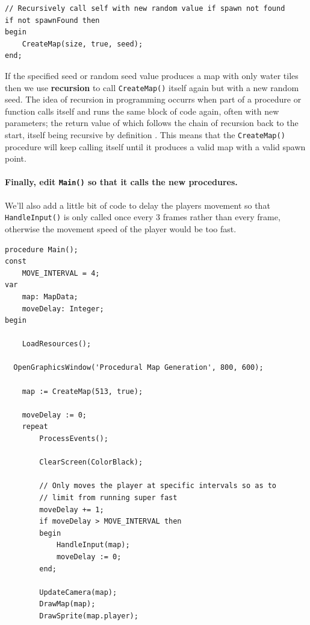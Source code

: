 \documentclass{article}
\begin{document}
\begin{verbatim}
// Recursively call self with new random value if spawn not found
if not spawnFound then
begin
	CreateMap(size, true, seed);
end;
\end{verbatim}

If the specified seed or random seed value produces a map with only water tiles then we use \textbf{recursion} to call \texttt{CreateMap()} itself again but with a new random seed. The idea of recursion in programming occurrs when part of a procedure or function calls itself and runs the same block of code again, often with new parameters; the return value of which follows the chain of recursion back to the start, itself being recursive by definition \parencite{recursion}. This means that the \texttt{CreateMap()} procedure will keep calling itself until it produces a valid map with a valid spawn point.

\paragraph{Finally, edit \texttt{Main()} so that it calls the new procedures.} We'll also add a little bit of code to delay the players movement so that \texttt{HandleInput()} is only called once every 3 frames rather than every frame, otherwise the movement speed of the player would be too fast.

\begin{verbatim}
procedure Main();
const
	MOVE_INTERVAL = 4;
var
	map: MapData;
	moveDelay: Integer;
begin

	LoadResources();
  
  OpenGraphicsWindow('Procedural Map Generation', 800, 600);
  
	map := CreateMap(513, true);

	moveDelay := 0;
	repeat
		ProcessEvents();

		ClearScreen(ColorBlack);
		
		// Only moves the player at specific intervals so as to
		// limit from running super fast
		moveDelay += 1;
		if moveDelay > MOVE_INTERVAL then
		begin
			HandleInput(map);
			moveDelay := 0;
		end;

		UpdateCamera(map);
		DrawMap(map);
		DrawSprite(map.player);
\end{verbatim}
\end{document}
